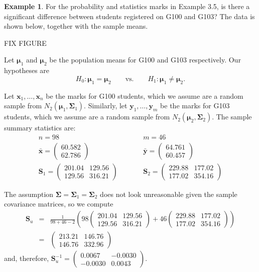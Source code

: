 \documentclass[]{book}
\theoremstyle{definition}
\theoremstyle{definition}
\newtheorem{example}{Example}[chapter]
\theoremstyle{definition}
\theoremstyle{remark}
\begin{document}
\begin{example}
\protect\hypertarget{exm:unnamed-chunk-4}{}{\label{exm:unnamed-chunk-4} }For the probability and statistics marks in Example 3.5, is there a significant difference between students registered on G100 and G103? The data is shown below, together with the sample means.

FIX FIGURE

Let \(\boldsymbol \mu_1\) and \(\boldsymbol \mu_2\) be the population means for G100 and G103 respectively. Our hypotheses are
\[H_0: \boldsymbol \mu_1 = \boldsymbol \mu_2 \qquad \text{vs.} \qquad H_1: \boldsymbol \mu_1 \neq \boldsymbol \mu_2.\]

Let \(\boldsymbol x_1,\ldots,\boldsymbol x_{n}\) be the marks for G100 students, which we assume are a random sample from \(N_2(\boldsymbol \mu_1,\boldsymbol \Sigma_1)\). Similarly, let \(\boldsymbol y_1,\ldots,\boldsymbol y_m\) be the marks for G103 students, which we assume are a random sample from \(N_2(\boldsymbol \mu_2,\boldsymbol \Sigma_2)\). The sample summary statistics are:
\begin{eqnarray*}
n = 98 &\qquad& m = 46 \\
\bar{\boldsymbol x} = \begin{pmatrix} 60.582 \\ 62.786 \end{pmatrix} &\qquad& \bar{\boldsymbol y} = \begin{pmatrix} 64.761 \\ 60.457 \end{pmatrix} \\
\boldsymbol S_1 = \begin{pmatrix} 201.04 & 129.56 \\ 129.56 & 316.21 \end{pmatrix} &\qquad& \boldsymbol S_2 = \begin{pmatrix} 229.88 & 177.02 \\ 177.02 & 354.16 \end{pmatrix}
\end{eqnarray*}

The assumption \(\boldsymbol \Sigma= \boldsymbol \Sigma_1 = \boldsymbol \Sigma_2\) does not look unreasonable given the sample covariance matrices, so we compute
\begin{eqnarray*}
\boldsymbol S_u &=& \frac{1}{98+46-2} \left(98 \begin{pmatrix} 201.04 & 129.56 \\ 129.56 & 316.21 \end{pmatrix} + 46 \begin{pmatrix} 229.88 & 177.02 \\ 177.02 & 354.16 \end{pmatrix} \right)\\
&=& \begin{pmatrix} 213.21 & 146.76 \\ 146.76 & 332.96 \end{pmatrix}
\end{eqnarray*}
and, therefore, \({\displaystyle\boldsymbol S_u^{-1} = \begin{pmatrix} 0.0067 & -0.0030 \\ -0.0030 & 0.0043 \end{pmatrix}}.\)


\end{example}
\end{document}
